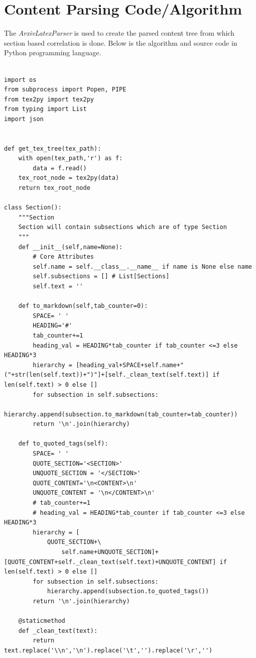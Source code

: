 \section{Content Parsing Code/Algorithm}
\label{appendix:content-parsing-code}
The \textit{ArxivLatexParser} is used to create the parsed content tree from which section based correlation is done. Below is the algorithm and source code in Python programming language.
\begin{lstlisting}
  
import os 
from subprocess import Popen, PIPE
from tex2py import tex2py 
from typing import List
import json


def get_tex_tree(tex_path):
    with open(tex_path,'r') as f:
        data = f.read()
    tex_root_node = tex2py(data)
    return tex_root_node

class Section():
    """Section 
    Section will contain subsections which are of type Section
    """
    def __init__(self,name=None):
        # Core Attributes
        self.name = self.__class__.__name__ if name is None else name
        self.subsections = [] # List[Sections]
        self.text = ''
    
    def to_markdown(self,tab_counter=0):
        SPACE= ' '
        HEADING='#'
        tab_counter+=1
        heading_val = HEADING*tab_counter if tab_counter <=3 else HEADING*3
        hierarchy = [heading_val+SPACE+self.name+"("+str(len(self.text))+")"]+[self._clean_text(self.text)] if len(self.text) > 0 else []
        for subsection in self.subsections:
            hierarchy.append(subsection.to_markdown(tab_counter=tab_counter))
        return '\n'.join(hierarchy)
    
    def to_quoted_tags(self):
        SPACE= ' '
        QUOTE_SECTION='<SECTION>'
        UNQUOTE_SECTION = '</SECTION>'
        QUOTE_CONTENT='\n<CONTENT>\n'
        UNQUOTE_CONTENT = '\n</CONTENT>\n'
        # tab_counter+=1
        # heading_val = HEADING*tab_counter if tab_counter <=3 else HEADING*3
        hierarchy = [
            QUOTE_SECTION+\
                self.name+UNQUOTE_SECTION]+[QUOTE_CONTENT+self._clean_text(self.text)+UNQUOTE_CONTENT] if len(self.text) > 0 else []
        for subsection in self.subsections:
            hierarchy.append(subsection.to_quoted_tags())
        return '\n'.join(hierarchy)

    @staticmethod
    def _clean_text(text):
        return text.replace('\\n','\n').replace('\t','').replace('\r','')
    

\end{lstlisting}
